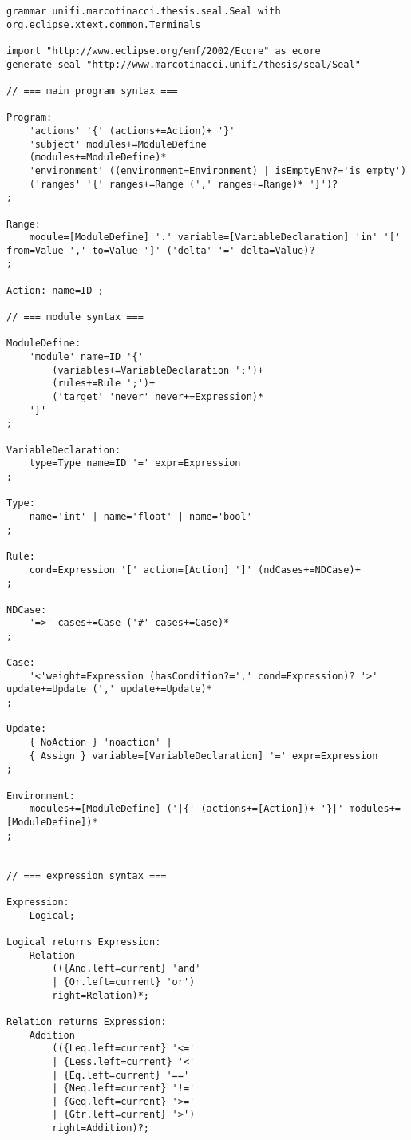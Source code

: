 \begin{lstlisting}[language=xtext,style=eclipse,caption={Sintassi di \acs{lapsa} in \xtext{}},label=code:lapsa:syntax]
grammar unifi.marcotinacci.thesis.seal.Seal with org.eclipse.xtext.common.Terminals

import "http://www.eclipse.org/emf/2002/Ecore" as ecore
generate seal "http://www.marcotinacci.unifi/thesis/seal/Seal"

// === main program syntax ===

Program:
	'actions' '{' (actions+=Action)+ '}'
	'subject' modules+=ModuleDefine
	(modules+=ModuleDefine)*
	'environment' ((environment=Environment) | isEmptyEnv?='is empty')
	('ranges' '{' ranges+=Range (',' ranges+=Range)* '}')?
;

Range:
	module=[ModuleDefine] '.' variable=[VariableDeclaration] 'in' '[' from=Value ',' to=Value ']' ('delta' '=' delta=Value)?
;

Action: name=ID ;

// === module syntax ===

ModuleDefine: 
	'module' name=ID '{'
		(variables+=VariableDeclaration ';')+
		(rules+=Rule ';')+
		('target' 'never' never+=Expression)*
	'}'
;

VariableDeclaration:
	type=Type name=ID '=' expr=Expression
;

Type:
	name='int' | name='float' | name='bool'
;

Rule:
	cond=Expression '[' action=[Action] ']' (ndCases+=NDCase)+
;

NDCase:
	'=>' cases+=Case ('#' cases+=Case)*
;

Case:
	'<'weight=Expression (hasCondition?=',' cond=Expression)? '>' update+=Update (',' update+=Update)*
;

Update:
	{ NoAction } 'noaction' | 
	{ Assign } variable=[VariableDeclaration] '=' expr=Expression
;

Environment:
	modules+=[ModuleDefine] ('|{' (actions+=[Action])+ '}|' modules+=[ModuleDefine])*
;


// === expression syntax ===

Expression:
	Logical;

Logical returns Expression:
	Relation
		(({And.left=current} 'and' 
		| {Or.left=current} 'or') 
		right=Relation)*;

Relation returns Expression:
	Addition 
		(({Leq.left=current} '<='
		| {Less.left=current} '<'
		| {Eq.left=current} '=='
		| {Neq.left=current} '!='
		| {Geq.left=current} '>='
		| {Gtr.left=current} '>')
		right=Addition)?;


\end{lstlisting}
